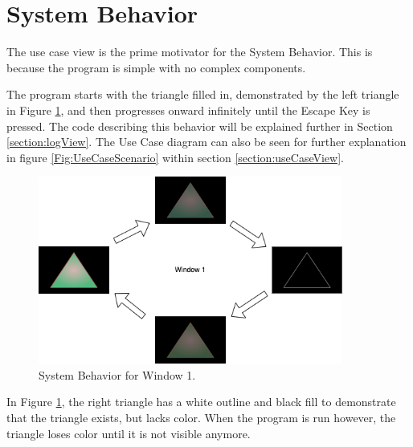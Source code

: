 \section{System Behavior}
\label{section:sysBehavior}

The use case view is the prime motivator for the System Behavior.
This is because the program is simple with no complex components.

The program starts with the triangle filled in, demonstrated by the left triangle in Figure \ref{Fig:SysBehaviorWindow1}, and then progresses onward infinitely until the Escape Key is pressed.
The code describing this behavior will be explained further in Section \ref{section:logView}.
The Use Case diagram can also be seen for further explanation in figure \ref{Fig:UseCaseScenario} within section \ref{section:useCaseView}.

\begin{figure}[htb]
    \centering
    \includegraphics[width=10cm]{./Images/SysBehavior.png}
       \caption{System Behavior for Window 1.}
           \label{Fig:SysBehaviorWindow1}
\end{figure}

In Figure \ref{Fig:SysBehaviorWindow1}, the right triangle has a white outline and black fill to demonstrate that the triangle exists, but lacks color.
When the program is run however, the triangle loses color until it is not visible anymore.

\newpage